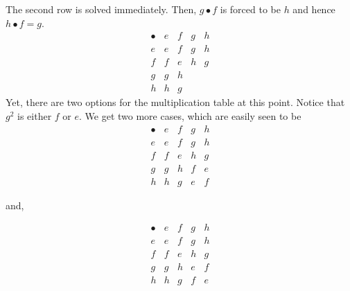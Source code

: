 \begin{solution}
	The second row is solved immediately. Then, $g\bullet f$ is forced to be $h$ and hence $h\bullet f = g$.
	{%
		\renewcommand{\arraystretch}{1.5}
		\[
		\begin{array}{c||c|c|c|c}
			\bullet & e & f & g & h\\
			\hline
			\hline
			e & e & f & g & h\\
			\hline
			f & f &e & h & g\\
			\hline
			g & g & h &  & \\
			\hline
			h & h &  g &  & 
		\end{array}
		\]
	}
	Yet, there are two options for the multiplication table at this point. Notice that $g^2$ is either $f$ or $e$. We get two more cases, which are easily seen to be 
	{%
		\renewcommand{\arraystretch}{1.5}
		\[
		\begin{array}{c||c|c|c|c}
			\bullet & e & f & g & h\\
			\hline
			\hline
			e & e & f & g & h\\
			\hline
			f & f &e & h & g\\
			\hline
			g & g & h & f & e\\
			\hline
			h & h &  g & e & f
		\end{array}
		\]
	}
	
	and,
	
	{%
		\renewcommand{\arraystretch}{1.5}
		\[
		\begin{array}{c||c|c|c|c}
			\bullet & e & f & g & h\\
			\hline
			\hline
			e & e & f & g & h\\
			\hline
			f & f &e & h & g\\
			\hline
			g & g & h & e & f\\
			\hline
			h & h &  g & f & e
		\end{array}
		\]
	}


\end{solution}
